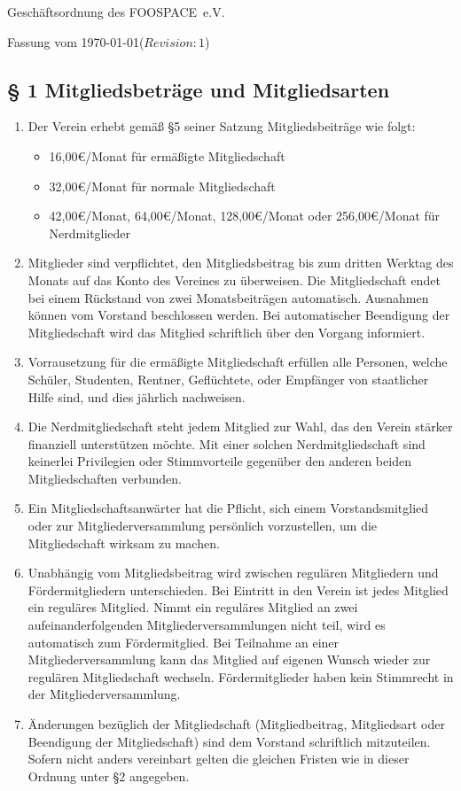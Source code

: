 \documentclass[10pt,a4paper]{article}
\newcommand{\name}{FOOSPACE}
\newcommand{\revision}{$Revision: 1$}
\begin{document}
{\LARGE Geschäftsordnung des \name\ e.V.}

Fassung vom \today (\revision)
%
%
\subsection*{§ 1 Mitgliedsbeträge und Mitgliedsarten}
\begin{enumerate}
\item Der Verein erhebt gemäß §5 seiner Satzung Mitgliedsbeiträge wie folgt:
	\begin{itemize}
    \item 16,00€/Monat für ermäßigte Mitgliedschaft
    \item 32,00€/Monat für normale Mitgliedschaft
	\item 42,00€/Monat, 64,00€/Monat, 128,00€/Monat oder 256,00€/Monat für Nerdmitglieder
	\end{itemize}
    

    \item Mitglieder sind verpflichtet, den Mitgliedsbeitrag bis zum dritten Werktag des Monats
    auf das Konto des Vereines zu überweisen. Die Mitgliedschaft endet bei einem Rückstand
    von zwei Monatsbeiträgen automatisch. Ausnahmen können vom Vorstand beschlossen werden.
    Bei automatischer Beendigung der Mitgliedschaft wird das Mitglied schriftlich über den
    Vorgang informiert.

    \item Vorrausetzung für die ermäßigte Mitgliedschaft erfüllen alle Personen, welche Schüler, Studenten,
    Rentner, Geflüchtete, oder Empfänger von staatlicher Hilfe sind, und dies jährlich nachweisen.

\item Die Nerdmitgliedschaft steht jedem Mitglied zur Wahl, das den Verein stärker
	finanziell unterstützen möchte. Mit einer solchen
	Nerdmitgliedschaft sind keinerlei Privilegien oder Stimmvorteile gegenüber
	den anderen beiden Mitgliedschaften verbunden.
    
    \item Ein Mitgliedschaftsanwärter hat die Pflicht, sich einem Vorstandsmitglied oder zur 
    Mitgliederversammlung persönlich vorzustellen, um die Mitgliedschaft wirksam zu machen.
    \item Unabhängig vom Mitgliedsbeitrag wird zwischen regulären Mitgliedern und Fördermitgliedern
    unterschieden. Bei Eintritt in den Verein ist jedes Mitglied ein reguläres Mitglied.
    Nimmt ein reguläres Mitglied an zwei aufeinanderfolgenden Mitgliederversammlungen nicht
    teil, wird es automatisch zum Fördermitglied. Bei Teilnahme an einer Mitgliederversammlung
    kann das Mitglied auf eigenen Wunsch wieder zur regulären Mitgliedschaft wechseln.
    Fördermitglieder haben kein Stimmrecht in der Mitgliederversammlung.

    
\item Änderungen bezüglich der Mitgliedschaft (Mitgliedbeitrag, Mitgliedsart oder Beendigung der Mitgliedschaft)
	sind dem Vorstand schriftlich mitzuteilen. Sofern nicht anders
    vereinbart gelten die gleichen Fristen wie in dieser Ordnung unter §2 angegeben.
\end{enumerate}
\end{document}
